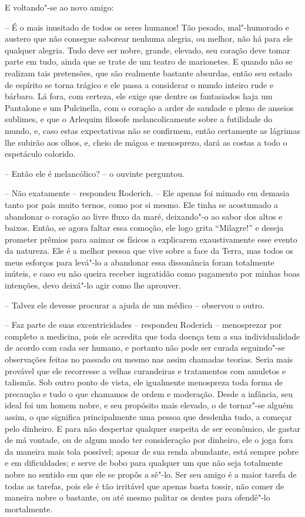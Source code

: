  E voltando"-se ao novo amigo:

 -- É o mais inusitado de todos os seres humanos! Tão pesado,
mal"-humorado e austero que não consegue saborear nenhuma alegria,
ou melhor, não há para ele qualquer alegria. Tudo deve ser nobre,
grande, elevado, seu coração deve tomar parte em tudo, ainda que se
trate de um teatro de marionetes. E quando não se realizam tais
pretensões, que são realmente bastante absurdas, então seu estado de
espírito se torna trágico e ele passa a considerar o mundo inteiro rude
e bárbaro. Lá fora, com certeza, ele exige que dentre os fantasiados
haja um Pantalone e um Pulcinella, com o coração a arder de saudade e
pleno de anseios sublimes, e que o Arlequim filosofe melancolicamente
sobre a futilidade do mundo, e, caso estas expectativas não se
confirmem, então certamente as lágrimas lhe subirão aos olhos, e, cheio
de mágoa e menosprezo, dará as costas a todo o espetáculo colorido.

-- Então ele é melancólico? -- o ouvinte perguntou.

-- Não exatamente -- respondeu Roderich. -- Ele apenas foi mimado em
demasia tanto por pais muito ternos, como por si mesmo. Ele tinha se
acostumado a abandonar o coração ao livre fluxo da maré, deixando"-o ao
sabor dos altos e baixos. Então, se agora faltar essa comoção, ele logo
grita ``Milagre!'' e deseja prometer prêmios para animar os físicos a
explicarem exaustivamente esse evento da natureza. Ele é a melhor
pessoa que vive sobre a face da Terra, mas todos os meus esforços para
levá"-lo a abandonar essa dissonância foram totalmente inúteis, e caso
eu não queira receber ingratidão como pagamento por minhas boas
intenções, devo deixá"-lo agir como lhe aprouver.

-- Talvez ele devesse procurar a ajuda de um médico -- observou o outro.

-- Faz parte de suas excentricidades -- respondeu Roderich --
menosprezar por completo a medicina, pois ele acredita que toda doença
tem a sua individualidade de acordo com cada ser humano, e portanto não
pode ser curada seguindo"-se observações feitas no passado ou mesmo nas
assim chamadas teorias. Seria mais provável que ele recorresse a velhas
curandeiras e tratamentos com amuletos e talismãs. Sob outro ponto de
vista, ele igualmente menospreza toda forma de precaução e tudo o que
chamamos de ordem e moderação. Desde a infância, seu ideal foi um homem
nobre, e seu propósito mais elevado, o de tornar"-se alguém assim, o que
significa principalmente uma pessoa que desdenha tudo, a começar pelo
dinheiro. E para não despertar qualquer suspeita de ser econômico, de
gastar de má vontade, ou de algum modo ter consideração por dinheiro,
ele o joga fora da maneira mais tola possível; apesar de sua renda
abundante, está sempre pobre e em dificuldades; e serve de bobo para
qualquer um que não seja totalmente nobre no sentido em que ele se
propôs a sê"-lo. Ser seu amigo é a maior tarefa de todas as tarefas,
pois ele é tão irritável que apenas basta tossir, não comer de maneira
nobre o bastante, ou até mesmo palitar os dentes para ofendê"-lo
mortalmente.

